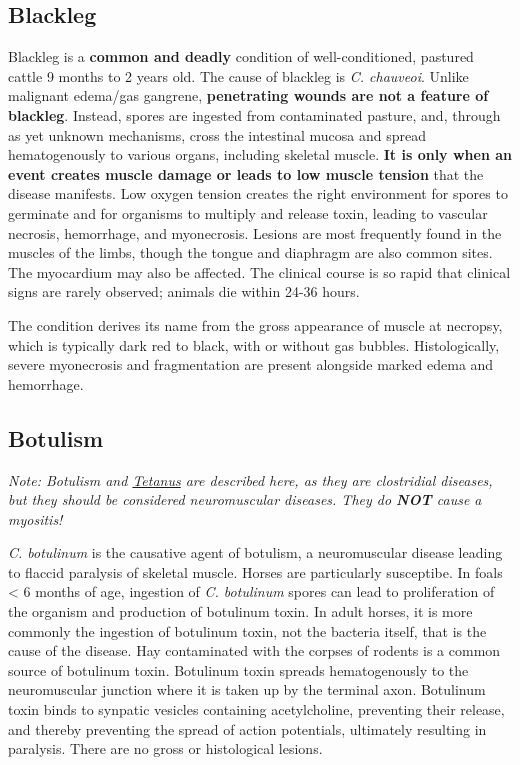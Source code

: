 \documentclass[openany]{book}
\begin{document}
\subsection{Blackleg}\label{blackleg}

Blackleg is a \textbf{common and deadly} condition of well-conditioned,
pastured cattle 9 months to 2 years old. The cause of blackleg is
\emph{C. chauveoi}. Unlike malignant edema/gas gangrene,
\textbf{penetrating wounds are not a feature of blackleg}. Instead,
spores are ingested from contaminated pasture, and, through as yet
unknown mechanisms, cross the intestinal mucosa and spread
hematogenously to various organs, including skeletal muscle. \textbf{It
is only when an event creates muscle damage or leads to low muscle
tension} that the disease manifests. Low oxygen tension creates the
right environment for spores to germinate and for organisms to multiply
and release toxin, leading to vascular necrosis, hemorrhage, and
myonecrosis. Lesions are most frequently found in the muscles of the
limbs, though the tongue and diaphragm are also common sites. The
myocardium may also be affected. The clinical course is so rapid that
clinical signs are rarely observed; animals die within 24-36 hours.

The condition derives its name from the gross appearance of muscle at
necropsy, which is typically dark red to black, with or without gas
bubbles. Histologically, severe myonecrosis and fragmentation are
present alongside marked edema and hemorrhage.

\hypertarget{botulism}{\subsection{Botulism}\label{botulism}}

\emph{Note: Botulism and \protect\hyperlink{tetanus}{Tetanus} are
described here, as they are clostridial diseases, but they should be
considered neuromuscular diseases. They do \textbf{NOT} cause a
myositis!}

\emph{C. botulinum} is the causative agent of botulism, a neuromuscular
disease leading to flaccid paralysis of skeletal muscle. Horses are
particularly susceptibe. In foals \textless{} 6 months of age, ingestion
of \emph{C. botulinum} spores can lead to proliferation of the organism
and production of botulinum toxin. In adult horses, it is more commonly
the ingestion of botulinum toxin, not the bacteria itself, that is the
cause of the disease. Hay contaminated with the corpses of rodents is a
common source of botulinum toxin. Botulinum toxin spreads hematogenously
to the neuromuscular junction where it is taken up by the terminal axon.
Botulinum toxin binds to synpatic vesicles containing acetylcholine,
preventing their release, and thereby preventing the spread of action
potentials, ultimately resulting in paralysis. There are no gross or
histological lesions.
\end{document}
